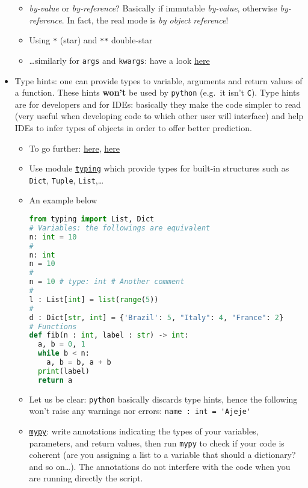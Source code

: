 \documentclass[a4paper,12pt,%
              final%
              ]{article}
\begin{document}
\begin{itemize}
    \begin{itemize}
      \item \emph{by-value} or \emph{by-reference}? Basically if immutable \emph{by-value}, otherwise \emph{by-reference}. In fact, the real mode is \emph{by object reference}!
      \item Using \texttt{*} (star) and \texttt{**} double-star
      \item \ldots{}similarly for \texttt{args} and \texttt{kwargs}: have a look \href{https://realpython.com/python-kwargs-and-args/}{here}
    \end{itemize}
  \item Type hints: one can provide types to variable, arguments and return values of a function. These hints \textbf{won't} be used by \texttt{python} (e.g.\ it isn't \texttt{C}). Type hints are for developers and for IDEs: basically they make the code simpler to read (very useful when developing code to which other user will interface) and help IDEs to infer types of objects in order to offer better prediction.
    \begin{itemize}
      \item To go further: \href{https://stackoverflow.com/a/32558710}{here}, \href{https://www.infoworld.com/article/3630372/get-started-with-python-type-hints.html}{here}
      \item Use module \href{https://docs.python.org/3/library/typing.html}{\texttt{typing}} which provide types for built-in structures such as \texttt{Dict}, \texttt{Tuple}, \texttt{List},\ldots
      \item An example below
\begin{lstlisting}[language=python]
from typing import List, Dict
# Variables: the followings are equivalent
n: int = 10
#
n: int
n = 10
#
n = 10 # type: int # Another comment
#
l : List[int] = list(range(5))
#
d : Dict[str, int] = {'Brazil': 5, "Italy": 4, "France": 2}
# Functions
def fib(n : int, label : str) -> int:
  a, b = 0, 1
  while b < n:
    a, b = b, a + b
  print(label)
  return a
\end{lstlisting}
      \item Let us be clear: \texttt{python} basically discards type hints, hence the following won't raise any warnings nor errors: \verb|name : int = 'Ajeje'|
      \item \href{https://mypy.readthedocs.io/en/stable/index.html}{\texttt{mypy}}: write annotations indicating the types of your variables, parameters, and return values, then run \texttt{mypy} to check if your code is coherent (are you assigning a list to a variable that should a dictionary? and so on\ldots). The annotations do not interfere with the code when you are running directly the script.

\end{itemize}
\end{itemize}
\end{document}
